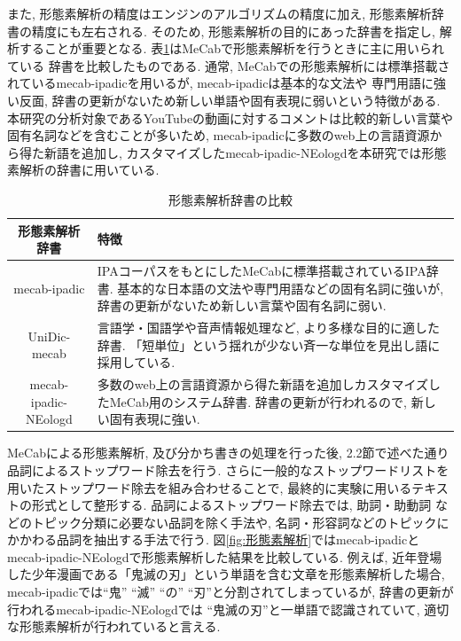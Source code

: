 \documentclass{ltjarticle}
\begin{document}
また, 形態素解析の精度はエンジンのアルゴリズムの精度に加え, 形態素解析辞書の精度にも左右される. 
そのため, 形態素解析の目的にあった辞書を指定し, 解析することが重要となる. 表\ref{table:辞書比較}はMeCabで形態素解析を行うときに主に用いられている
辞書を比較したものである. 通常, MeCabでの形態素解析には標準搭載されているmecab-ipadicを用いるが, mecab-ipadicは基本的な文法や
専門用語に強い反面, 辞書の更新がないため新しい単語や固有表現に弱いという特徴がある. 
本研究の分析対象であるYouTubeの動画に対するコメントは比較的新しい言葉や固有名詞などを含むことが多いため, 
mecab-ipadicに多数のweb上の言語資源から得た新語を追加し, カスタマイズしたmecab-ipadic-NEologdを本研究では形態素解析の辞書に用いている. 
\begin{table}[ht]
    \caption{形態素解析辞書の比較}
    \vspace{5truept}

    \centering
    \begin{tabular}{cp{10cm}}
        \hline
        形態素解析辞書 & 特徴 \\
        \hline\hline
        mecab-ipadic & IPAコーパスをもとにしたMeCabに標準搭載されているIPA辞書. 基本的な日本語の文法や専門用語などの固有名詞に強いが, 辞書の更新がないため新しい言葉や固有名詞に弱い. \\
        \hline
        UniDic-mecab & 言語学・国語学や音声情報処理など, より多様な目的に適した辞書. 「短単位」という揺れが少ない斉一な単位を見出し語に採用している. \\
        \hline
        mecab-ipadic-NEologd & 多数のweb上の言語資源から得た新語を追加しカスタマイズしたMeCab用のシステム辞書. 辞書の更新が行われるので, 新しい固有表現に強い. \\
        \hline
    \end{tabular}
    \label{table:辞書比較}
\end{table}
\newpage

MeCabによる形態素解析, 及び分かち書きの処理を行った後, 2.2節で述べた通り品詞によるストップワード除去を行う. さらに一般的なストップワードリストを
用いたストップワード除去を組み合わせることで, 最終的に実験に用いるテキストの形式として整形する. 品詞によるストップワード除去では, 助詞・助動詞
などのトピック分類に必要ない品詞を除く手法や, 名詞・形容詞などのトピックにかかわる品詞を抽出する手法で行う. 
図\ref{fig:形態素解析}ではmecab-ipadicとmecab-ipadic-NEologdで形態素解析した結果を比較している. 例えば, 近年登場した少年漫画である「鬼滅の刃」という単語を含む文章を形態素解析した場合, 
mecab-ipadicでは``鬼'' ``滅'' ``の'' ``刃''と分割されてしまっているが, 辞書の更新が行われるmecab-ipadic-NEologdでは
``鬼滅の刃''と一単語で認識されていて, 適切な形態素解析が行われていると言える. 
\vspace{10truept}
\end{document}
